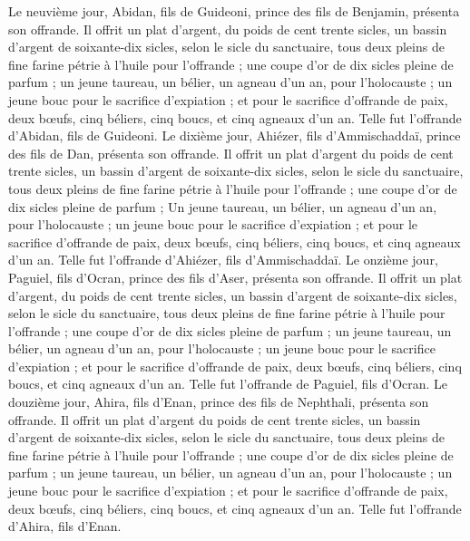 \begin{multicols}{2}
Le neuvième jour, Abidan, fils de Guideoni, prince des fils de Benjamin, présenta son offrande.
Il offrit un plat d'argent, du poids de cent trente sicles, un bassin d'argent de soixante-dix sicles, selon le sicle du sanctuaire, tous deux pleins de fine farine pétrie à l'huile pour l’offrande ;
une coupe d'or de dix sicles pleine de parfum ;
un jeune taureau, un bélier, un agneau d'un an, pour l'holocauste ;
un jeune bouc pour le sacrifice d’expiation ;
et pour le sacrifice d’offrande de paix, deux bœufs, cinq béliers, cinq boucs, et cinq agneaux d'un an. Telle fut l'offrande d'Abidan, fils de Guideoni.
Le dixième jour, Ahiézer, fils d’Ammischaddaï, prince des fils de Dan, présenta son offrande.
Il offrit un plat d'argent du poids de cent trente sicles, un bassin d'argent de soixante-dix sicles, selon le sicle du sanctuaire, tous deux pleins de fine farine pétrie à l'huile pour l’offrande ;
une coupe d'or de dix sicles pleine de parfum ;
Un jeune taureau, un bélier, un agneau d'un an, pour l'holocauste ;
un jeune bouc pour le sacrifice d’expiation ;
et pour le sacrifice d’offrande de paix, deux bœufs, cinq béliers, cinq boucs, et cinq agneaux d'un an. Telle fut l'offrande d'Ahiézer, fils d’Ammischaddaï.
Le onzième jour, Paguiel, fils d’Ocran, prince des fils d'Aser, présenta son offrande.
Il offrit un plat d’argent, du poids de cent trente sicles, un bassin d'argent de soixante-dix sicles, selon le sicle du sanctuaire, tous deux pleins de fine farine pétrie à l'huile pour l’offrande ;
une coupe d'or de dix sicles pleine de parfum ;
un jeune taureau, un bélier, un agneau d'un an, pour l'holocauste ;
un jeune bouc pour le sacrifice d’expiation ;
et pour le sacrifice d’offrande de paix, deux bœufs, cinq béliers, cinq boucs, et cinq agneaux d'un an. Telle fut l'offrande de Paguiel, fils d’Ocran.
Le douzième jour, Ahira, fils d’Enan, prince des fils de Nephthali, présenta son offrande.
Il offrit un plat d'argent du poids de cent trente sicles, un bassin d'argent de soixante-dix sicles, selon le sicle du sanctuaire, tous deux pleins de fine farine pétrie à l'huile pour l’offrande ;
une coupe d'or de dix sicles pleine de parfum ;
un jeune taureau, un bélier, un agneau d'un an, pour l'holocauste ;
un jeune bouc pour le sacrifice d’expiation ;
et pour le sacrifice d’offrande de paix, deux bœufs, cinq béliers, cinq boucs, et cinq agneaux d'un an. Telle fut l'offrande d'Ahira, fils d’Enan.

\end{multicols}
